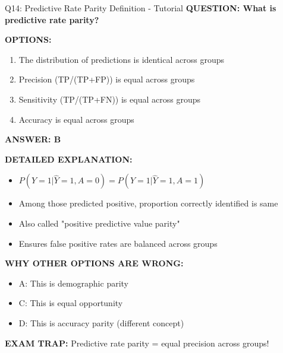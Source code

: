 \documentclass[8pt]{beamer}
\begin{document}
	\begin{frame}{Q14: Predictive Rate Parity Definition - Tutorial}
		\fontsize{6.5}{7.5}\selectfont
		\textbf{QUESTION: What is predictive rate parity?}
		
		\vspace{0.1cm}
		\textbf{OPTIONS:}
		\begin{enumerate}
			\item The distribution of predictions is identical across groups
			\item Precision (TP/(TP+FP)) is equal across groups
			\item Sensitivity (TP/(TP+FN)) is equal across groups
			\item Accuracy is equal across groups
		\end{enumerate}
		
		\vspace{0.1cm}
		\textcolor{myblue}{\textbf{ANSWER: B}}
		
		\vspace{0.1cm}
		\textbf{DETAILED EXPLANATION:}
		\begin{itemize}
			\item $P(Y=1|\hat{Y}=1,A=0) = P(Y=1|\hat{Y}=1,A=1)$
			\item Among those predicted positive, proportion correctly identified is same
			\item Also called "positive predictive value parity"
			\item Ensures false positive rates are balanced across groups
		\end{itemize}
		
		\vspace{0.1cm}
		\textcolor{myred}{\textbf{WHY OTHER OPTIONS ARE WRONG:}}
		\begin{itemize}
			\item \textcolor{myred}{A:} This is demographic parity
			\item \textcolor{myred}{C:} This is equal opportunity
			\item \textcolor{myred}{D:} This is accuracy parity (different concept)
		\end{itemize}
		
		\textcolor{myred}{\textbf{EXAM TRAP:}} Predictive rate parity = \textcolor{myblue}{equal precision across groups}!
	\end{frame}
	
\end{document}

